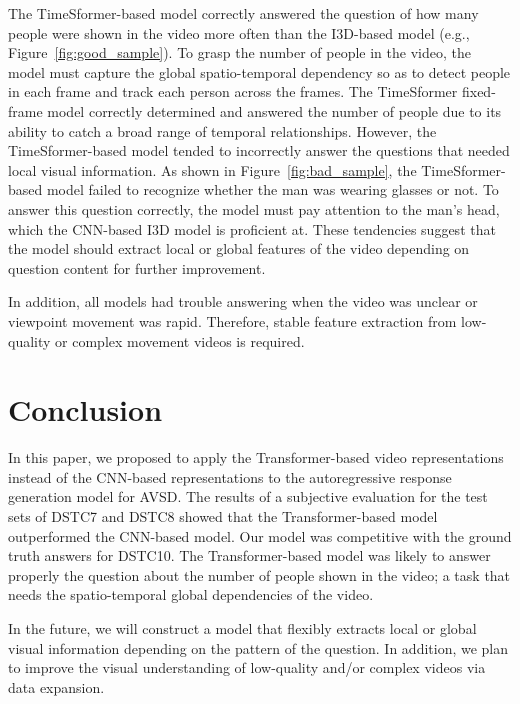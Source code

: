 \documentclass[letterpaper]{article}
\begin{document}
The TimeSformer-based model correctly answered the question of how many people were shown in the video more often than the I3D-based model (e.g., Figure~\ref{fig:good_sample}).
To grasp the number of people in the video, the model must capture the global spatio-temporal dependency so as to detect people in each frame and track each person across the frames.
The TimeSformer fixed-frame model correctly determined and answered the number of people due to its ability to catch a broad range of temporal relationships.
However, the TimeSformer-based model tended to incorrectly answer the questions that needed local visual information.
As shown in Figure~\ref{fig:bad_sample}, the TimeSformer-based model failed to recognize whether the man was wearing glasses or not.
To answer this question correctly, the model must pay attention to the man's head, which the CNN-based I3D model is proficient at.
These tendencies suggest that the model should extract local or global features of the video depending on question content for further improvement.

In addition, all models had trouble answering when the video was unclear or viewpoint movement was rapid.
Therefore, stable feature extraction from low-quality or complex movement videos is required.

\section{Conclusion}
In this paper, we proposed to apply the Transformer-based video representations instead of the CNN-based representations to the autoregressive response generation model for AVSD.
The results of a subjective evaluation for the test sets of DSTC7 and DSTC8 showed that the Transformer-based model outperformed the CNN-based model.
Our model was competitive with the ground truth answers for DSTC10.
The Transformer-based model was likely to answer properly the question about the number of people shown in the video; a task that needs the spatio-temporal global dependencies of the video.

In the future, we will construct a model that flexibly extracts local or global visual information depending on the pattern of the question.
In addition, we plan to improve the visual understanding of low-quality and/or complex videos via data expansion.
\end{document}
